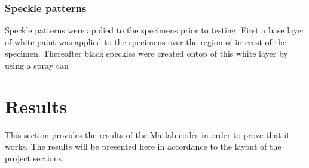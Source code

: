 \documentclass[12pt,oneside,openany,a4paper, %
english, %
masters-t, goldenblock]{usthesis}
\begin{document}









\subsection{Speckle patterns}
Speckle patterns were applied to the specimens prior to testing. First a base layer of white paint was applied to the specimens over the region of interest of the specimen. Thereafter black speckles were created ontop of this white layer by using a spray can 
















\chapter{Results}
This section provides the results of the Matlab codes in order to prove that it works. The results will be presented here in accordance to the layout of the project sections.
\end{document}
